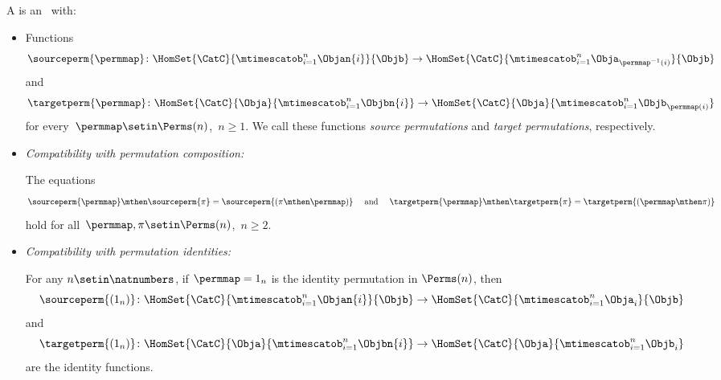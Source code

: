 \begin{ctdefinition}
    \label{def:symmetric-stacking-category}
    A  is an  ~\CatC with:

    \constit

    \begin{itemize}
        \item Functions
              \begin{equation}
                  \sourceperm{\permmap} \colon \HomSet{\CatC}{\mtimescatob_{i=1}^n \Objan{i}}{\Objb} \to \HomSet{\CatC}{\mtimescatob_{i=1}^n \Obja_{\permmap^{-1}(i)}}{\Objb}
              \end{equation}
              and
              \begin{equation}
                  \targetperm{\permmap} \colon \HomSet{\CatC}{\Obja}{\mtimescatob_{i=1}^n \Objbn{i}} \to \HomSet{\CatC}{\Obja}{\mtimescatob_{i=1}^n \Objb_{\permmap(i)}}
              \end{equation}
              for every~$\permmap \setin \Perms(n)$,~$n \geq 1$.
              We call these functions \emph{source permutations} and \emph{target permutations}, respectively.
    \end{itemize}

    \condit

    \begin{itemize}

        \item \emph{Compatibility with permutation composition:}

              The equations
              \begin{equation}
                  \label{eq:perm-compatibility-with-perm-comp}
                  \sourceperm{\permmap} \mthen \sourceperm{\pi} = \sourceperm{(\pi\mthen\permmap)}
                  \quad \text{ and } \quad
                  \targetperm{\permmap} \mthen \targetperm{\pi} = \targetperm{(\permmap \mthen \pi)}
              \end{equation}
              hold for all~$\permmap, \pi \setin \Perms(n)$,~$n \geq 2$.

        \item \emph{Compatibility with permutation identities:}

              For any $n \setin\natnumbers$, if $\permmap = 1_n$ is the identity permutation in $\Perms(n)$, then
              \begin{equation}
                  \label{eq:perm-compatibility-with-perm-identity-1}
                  \sourceperm{(1_n)} \colon \HomSet{\CatC}{\mtimescatob_{i=1}^n \Objan{i}}{\Objb} \to \HomSet{\CatC}{\mtimescatob_{i=1}^n \Obja_{i}}{\Objb}
              \end{equation}
              and
              \begin{equation}
                  \label{eq:perm-compatibility-with-perm-identity-2}
                  \targetperm{(1_n)} \colon \HomSet{\CatC}{\Obja}{\mtimescatob_{i=1}^n \Objbn{i}} \to \HomSet{\CatC}{\Obja}{\mtimescatob_{i=1}^n \Objb_i}
              \end{equation}
              are the identity functions.


\end{itemize}
\end{ctdefinition}
